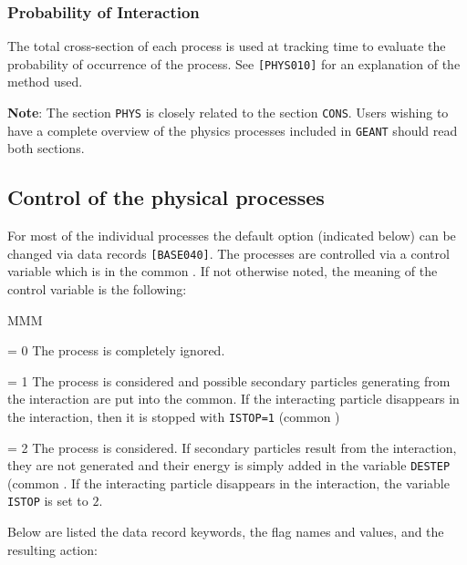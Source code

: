 \subsubsection{Probability of Interaction}
The total cross-section of each process is used at tracking time to evaluate 
the probability of occurrence of the process. See {\tt [PHYS010]} for an 
explanation of the method used.
 
{\bf Note}: The section {\tt PHYS} is closely related to the section {\tt CONS}.
Users wishing to have a complete overview of the physics processes
included in {\tt GEANT} should read both sections.

\subsection{ Control of the physical processes}
 
For most of the individual processes the default option (indicated
below) can be changed via data records {\tt [BASE040]}.
The processes are controlled via a control variable which is in the
common . 
If not otherwise noted, 
the meaning of the control variable is the following:
\begin{DLtt}{MMM}
\item[= 0] The process is completely ignored. 
\item[= 1] The process is considered and possible secondary particles generating
from the interaction are put into the  common. If the
interacting particle disappears in the interaction, then it is stopped
with {\tt ISTOP=1} (common )
\item[= 2] The process is considered. If secondary particles result from the
interaction, they are not generated and their energy is simply added in the
variable {\tt DESTEP} (common . If the interacting particle
disappears in the interaction, the variable {\tt ISTOP} is set
to $2$.
\end{DLtt}
Below are listed the data record keywords, the flag names and values, and
the resulting action:

